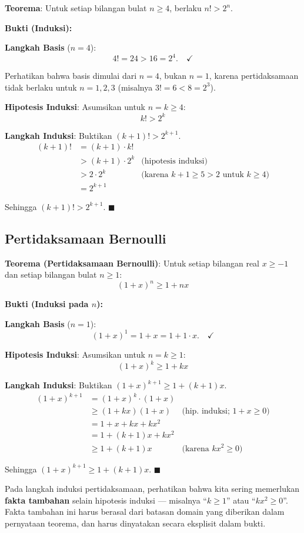 \begin{contoh}
\textbf{Teorema}: Untuk setiap bilangan bulat $n \geq 4$, berlaku $n! > 2^n$.

\textbf{Bukti (Induksi):}

\textbf{Langkah Basis} ($n = 4$):
\[ 4! = 24 > 16 = 2^4. \quad \checkmark \]

Perhatikan bahwa basis dimulai dari $n = 4$, bukan $n = 1$, karena pertidaksamaan tidak berlaku untuk $n = 1, 2, 3$ (misalnya $3! = 6 < 8 = 2^3$).

\textbf{Hipotesis Induksi}: Asumsikan untuk $n = k \geq 4$:
\[ k! > 2^k \]

\textbf{Langkah Induksi}: Buktikan $(k+1)! > 2^{k+1}$.
\begin{align*}
(k+1)! &= (k+1) \cdot k! \\
        &> (k+1) \cdot 2^k & \text{(hipotesis induksi)} \\
        &> 2 \cdot 2^k & \text{(karena } k+1 \geq 5 > 2 \text{ untuk } k \geq 4) \\
        &= 2^{k+1}
\end{align*}

Sehingga $(k+1)! > 2^{k+1}$. $\blacksquare$
\end{contoh}

\subsection{Pertidaksamaan Bernoulli}

\begin{contoh}
\textbf{Teorema (Pertidaksamaan Bernoulli)}: Untuk setiap bilangan real $x \geq -1$ dan setiap bilangan bulat $n \geq 1$:
\[ (1 + x)^n \geq 1 + nx \]

\textbf{Bukti (Induksi pada $n$):}

\textbf{Langkah Basis} ($n = 1$):
\[ (1+x)^1 = 1 + x = 1 + 1 \cdot x. \quad \checkmark \]

\textbf{Hipotesis Induksi}: Asumsikan untuk $n = k \geq 1$:
\[ (1 + x)^k \geq 1 + kx \]

\textbf{Langkah Induksi}: Buktikan $(1 + x)^{k+1} \geq 1 + (k+1)x$.
\begin{align*}
(1 + x)^{k+1} &= (1 + x)^k \cdot (1 + x) \\
               &\geq (1 + kx)(1 + x) & \text{(hip. induksi; } 1+x \geq 0) \\
               &= 1 + x + kx + kx^2 \\
               &= 1 + (k+1)x + kx^2 \\
               &\geq 1 + (k+1)x & \text{(karena } kx^2 \geq 0)
\end{align*}

Sehingga $(1+x)^{k+1} \geq 1 + (k+1)x$. $\blacksquare$
\end{contoh}

\begin{catatan}
Pada langkah induksi pertidaksamaan, perhatikan bahwa kita sering memerlukan \textbf{fakta tambahan} selain hipotesis induksi --- misalnya ``$k \geq 1$'' atau ``$kx^2 \geq 0$''. Fakta tambahan ini harus berasal dari batasan domain yang diberikan dalam pernyataan teorema, dan harus dinyatakan secara eksplisit dalam bukti.
\end{catatan}
